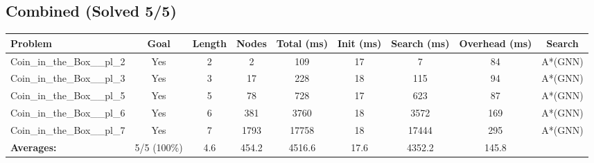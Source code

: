 \documentclass{article}
\begin{document}
\subsection*{Combined (Solved 5/5)}
\begin{tabular}{lcccccccc}
\toprule
Problem & Goal & Length & Nodes & Total (ms) & Init (ms) & Search (ms) & Overhead (ms) & Search \\
\midrule
Coin\_in\_the\_Box\_\_pl\_2 & Yes & 2 & 2 & 109 & 17 & 7 & 84 & A*(GNN) \\
Coin\_in\_the\_Box\_\_pl\_3 & Yes & 3 & 17 & 228 & 18 & 115 & 94 & A*(GNN) \\
Coin\_in\_the\_Box\_\_pl\_5 & Yes & 5 & 78 & 728 & 17 & 623 & 87 & A*(GNN) \\
Coin\_in\_the\_Box\_\_pl\_6 & Yes & 6 & 381 & 3760 & 18 & 3572 & 169 & A*(GNN) \\
Coin\_in\_the\_Box\_\_pl\_7 & Yes & 7 & 1793 & 17758 & 18 & 17444 & 295 & A*(GNN) \\
\textbf{Averages:} & 5/5 (100\%) & 4.6 & 454.2 & 4516.6 & 17.6 & 4352.2 & 145.8 & \\
\bottomrule
\end{tabular}
\\[0.7cm]
\end{document}
